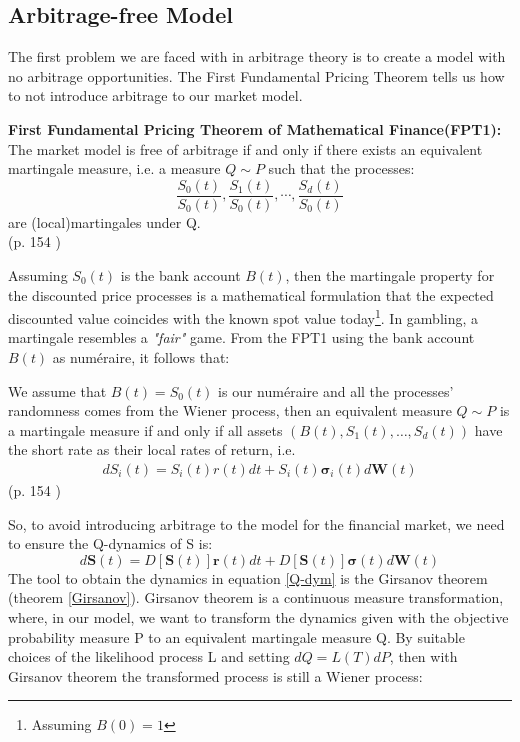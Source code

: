 \subsection{Arbitrage-free Model}
The first problem we are faced with in arbitrage theory is to create a model with no arbitrage opportunities. The First Fundamental Pricing Theorem tells us how to not introduce arbitrage to our market model.
\begin{theorem}\label{FFT1}
\textbf{First Fundamental Pricing Theorem of Mathematical Finance(FPT1): } The market model is free of arbitrage if and only if there exists an equivalent martingale measure, i.e. a measure $Q\sim P$ such that the processes:
$$\frac{S_0(t)}{S_0(t)}, \frac{S_1(t)}{S_0(t)}, \cdots, \frac{S_d(t)}{S_0(t)}$$
are (local)martingales under Q.
\\ \null \hfill (p. 154 \parencite{finKont})
\end{theorem}
Assuming $S_0(t)$ is the bank account $B(t)$, then the martingale property for the discounted price processes is a mathematical formulation that the expected discounted value coincides with the known spot value today\footnote{Assuming $B(0)=1$}. In gambling, a martingale resembles a \textsl{"fair"} game. From the FPT1 using the bank account $B(t)$ as numéraire, it follows that:
\theoremstyle{proposition}
\begin{proposition}{}
We assume that $B(t)=S_0(t)$ is our numéraire and all the processes' randomness comes from the Wiener process, then an equivalent measure $Q \sim P$ is a martingale measure if and only if all assets $(B(t), S_1(t), \ldots, S_d(t))$ have the short rate as their local rates of return, i.e.
\begin{align*}
dS_i(t)=S_i(t)r(t)dt+S_i(t)\bm{\sigma}_i(t)d\bm{W}(t)
\end{align*}
\null \hfill (p. 154 \parencite{finKont})
\end{proposition}
So, to avoid introducing arbitrage to the model for the financial market, we need to ensure the Q-dynamics of S is:
\begin{equation}\label{Q-dym}
d\bm{S}(t)=D[\bm{S}(t)]\bm{r}(t)dt+D[\bm{S}(t)]\bm{\sigma}(t)d\bm{W}(t)
\end{equation}
The tool to obtain the dynamics in equation \eqref{Q-dym} is the Girsanov theorem (theorem \ref{Girsanov}). Girsanov theorem is a continuous measure transformation, where, in our model, we want to transform the dynamics given with the objective probability measure P to an equivalent martingale measure Q. By suitable choices of the likelihood process L and setting $dQ=L(T)dP$, then with Girsanov theorem the transformed process is still a Wiener process:

